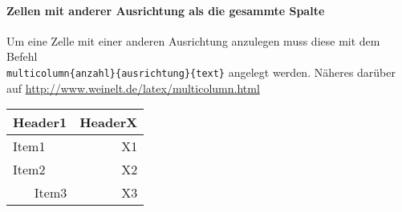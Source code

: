 \paragraph{Zellen mit anderer Ausrichtung als die gesammte Spalte}
Um eine Zelle mit einer anderen Ausrichtung anzulegen muss diese mit dem Befehl \\ \verb|multicolumn{anzahl}{ausrichtung}{text}| angelegt werden. Näheres darüber auf \url{http://www.weinelt.de/latex/multicolumn.html}
\begin{table}[h]
	\begin{tabular}{|l|r|}
		\hline
		Header1 & HeaderX \\ \hline
		Item1   & X1      \\ 
		Item2   & X2      \\ 
		\multicolumn{1}{|r|}{Item3}   & X3      \\
		\hline
	\end{tabular}
\end{table}